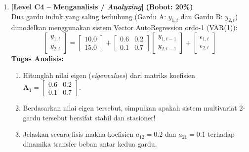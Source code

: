\documentclass[11pt,a4paper]{article}
\begin{document}
\begin{enumerate}[leftmargin=1.5em, label=\textbf{Soal \arabic*.}]
    \newpage

    \item \textbf{[Level C4 -- Menganalisis / \textit{Analyzing}]} \hfill \textbf{(Bobot: 20\%)} \\
    Dua gardu induk yang saling terhubung (Gardu A: $y_{1,t}$ dan Gardu B: $y_{2,t}$) dimodelkan menggunakan sistem Vector AutoRegression ordo-1 (VAR(1)):
    \begin{equation*}
        \begin{bmatrix} y_{1,t} \\ y_{2,t} \end{bmatrix} = \begin{bmatrix} 10.0 \\ 15.0 \end{bmatrix} + \begin{bmatrix} 0.6 & 0.2 \\ 0.1 & 0.7 \end{bmatrix} \begin{bmatrix} y_{1,t-1} \\ y_{2,t-1} \end{bmatrix} + \begin{bmatrix} \epsilon_{1,t} \\ \epsilon_{2,t} \end{bmatrix}
    \end{equation*}
    \textbf{Tugas Analisis:}
    \begin{enumerate}[label=\alph*.]
        \item Hitunglah nilai eigen (\textit{eigenvalues}) dari matriks koefisien $\mathbf{A}_1 = \begin{bmatrix} 0.6 & 0.2 \\ 0.1 & 0.7 \end{bmatrix}$.
        \item Berdasarkan nilai eigen tersebut, simpulkan apakah sistem multivariat 2-gardu tersebut bersifat stabil dan stasioner!
        \item Jelaskan secara fisis makna koefisien $a_{12} = 0.2$ dan $a_{21} = 0.1$ terhadap dinamika transfer beban antar kedua gardu.
    \end{enumerate}

    \vspace{0.4cm}


\end{enumerate}
\end{document}
